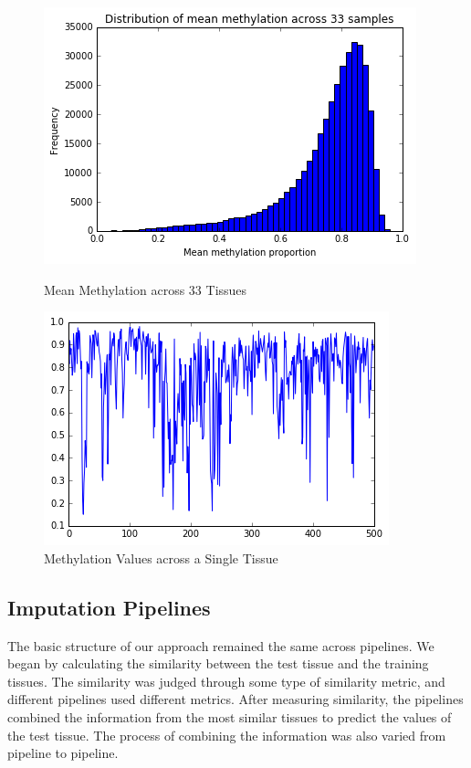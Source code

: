 \documentclass{article} %
\begin{document}
\begin{figure}[!ht]
\begin{minipage}[b]{0.50\linewidth}
\begin{center}
	\includegraphics[scale=0.4]{MeanMethylations.png}
	\caption{Mean Methylation across 33 Tissues}
\end{center}
\end{minipage}
\begin{minipage}[b]{0.50\linewidth}
\begin{center}
	\includegraphics[scale=0.4]{GraphMethylationValues.png}
	\caption{Methylation Values across a Single Tissue}
\end{center}
\end{minipage}
\end{figure}

\subsection{Imputation Pipelines}
The basic structure of our approach remained the same across pipelines. We began by calculating the similarity between the test tissue and the training tissues. The similarity was judged through some type of similarity metric, and different pipelines used different metrics. After measuring similarity, the pipelines combined the information from the most similar tissues to predict the values of the test tissue. The process of combining the information was also varied from pipeline to pipeline.
\end{document}

